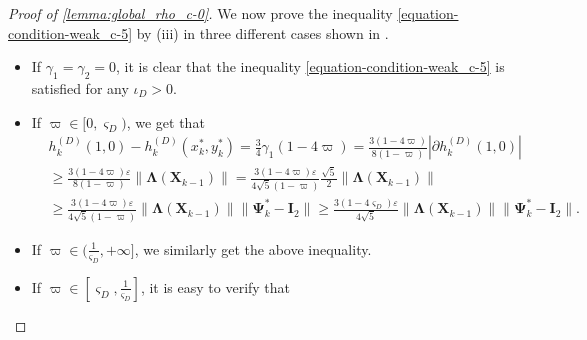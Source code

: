 \documentclass[final,onefignum,onetabnum]{siamart190516}
\newcommand{\matr}[1]{\boldsymbol{#1}}
\newcommand{\Utwo}{\Psi}
\begin{document}
\begin{proof}[Proof of \cref{lemma:global_rho_c-0}]
We now prove the inequality \cref{equation-condition-weak_c-5} by (iii) in three different cases shown in .
\begin{itemize}
\item 
If $\gamma_{1}=\gamma_{2} = 0$, it is clear that the inequality \cref{equation-condition-weak_c-5} is satisfied for any $\iota_{D}>0$.\\
\item 
If $\varpi\in[0,\varsigma_{D})$, we get that 
\begin{align*}
&h^{(D)}_{k}(1,0) - h^{(D)}_{k}(x_k^*,y_k^*)
=\frac{3}{4}\gamma_{1}(1-4\varpi)  
=\frac{3(1-4\varpi)}{8(1-\varpi)}|\partial h^{(D)}_{k}(1,0)|\\
&\geq \frac{3(1-4\varpi)\varepsilon}{8(1-\varpi)}\|\matr{\Lambda}(\matr{X}_{k-1})\|
=\frac{3(1-4\varpi)\varepsilon}{4\sqrt{5}(1-\varpi)}\frac{\sqrt{5}}{2}\|\matr{\Lambda}(\matr{X}_{k-1})\|\\
&\geq\frac{3(1-4\varpi)\varepsilon}{4\sqrt{5}(1-\varpi)}\|\matr{\Lambda}(\matr{X}_{k-1})\|\|\matr{\Utwo}^{*}_{k}-\matr{I}_{2}\| 
\geq\frac{3(1-4\varsigma_{D})\varepsilon}{4\sqrt{5}}\|\matr{\Lambda}(\matr{X}_{k-1})\|\|\matr{\Utwo}^{*}_{k}-\matr{I}_{2}\|. 
\end{align*}
\item If $\varpi\in(\frac{1}{\varsigma_{D}},+\infty]$, we similarly get the above inequality. 
\item If $\varpi\in [\varsigma_{D},\frac{1}{\varsigma_{D}}]$,
it is easy to verify that 
\begin{equation}\label{eq:inequa_rho_r4_c}

\end{equation}
\end{itemize}
\end{proof}
\end{document}
